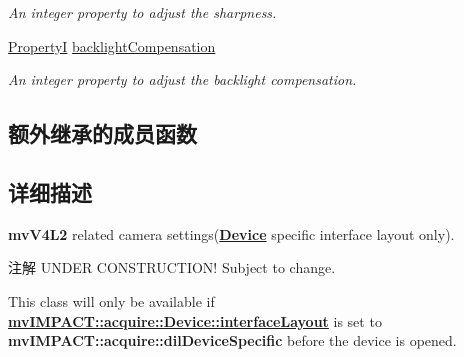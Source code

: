 \begin{DoxyCompactItemize}
\begin{DoxyCompactList}\small\item\em An integer property to adjust the sharpness. \end{DoxyCompactList}\item 
\hyperlink{group___common_interface_ga12d5e434238ca242a1ba4c6c3ea45780}{Property\+I} \hyperlink{classmv_i_m_p_a_c_t_1_1acquire_1_1_camera_settings_v4_l2_device_ae3a03df1b438f1cf58bb601f5514c689}{backlight\+Compensation}
\begin{DoxyCompactList}\small\item\em An integer property to adjust the backlight compensation. \end{DoxyCompactList}\end{DoxyCompactItemize}
\subsection*{额外继承的成员函数}


\subsection{详细描述}
{\bfseries mv\+V4\+L2} related camera settings({\bfseries \hyperlink{classmv_i_m_p_a_c_t_1_1acquire_1_1_device}{Device}} specific interface layout only). 

\begin{DoxyNote}{注解}
U\+N\+D\+E\+R C\+O\+N\+S\+T\+R\+U\+C\+T\+I\+O\+N! Subject to change.

This class will only be available if {\bfseries \hyperlink{classmv_i_m_p_a_c_t_1_1acquire_1_1_device_ab4dd0ecc9d456bb5ddc01d844c9d6f2d}{mv\+I\+M\+P\+A\+C\+T\+::acquire\+::\+Device\+::interface\+Layout}} is set to {\bfseries mv\+I\+M\+P\+A\+C\+T\+::acquire\+::dil\+Device\+Specific} before the device is opened. 
\end{DoxyNote}


